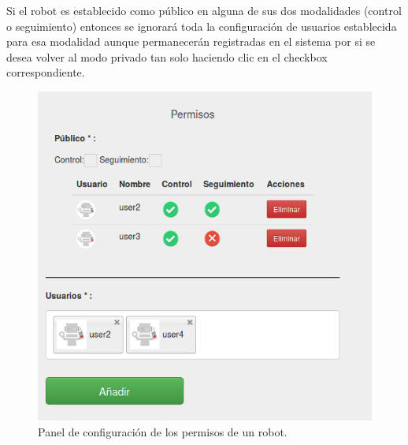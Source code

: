 Si el robot es establecido como público en alguna de sus dos modalidades (control o seguimiento) entonces se ignorará toda la configuración de usuarios establecida para esa modalidad aunque
permanecerán registradas en el sistema por si se desea volver al modo privado tan solo haciendo clic en el checkbox correspondiente.\\

\begin{figure}[H]
  \begin{center}
    \includegraphics[scale=0.5]{imagenes/manual-usuario/panel-permisos.png}
  \end{center}
  \caption{Panel de configuración de los permisos de un robot.}
  \label{website:creacion-robot}
\end{figure}


